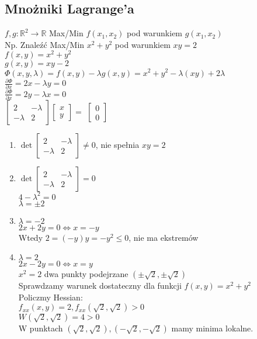 \documentclass{article}
\theoremstyle{definition}
\theoremstyle{definition}
\theoremstyle{definition}
\theoremstyle{definition}
\theoremstyle{definition}
\theoremstyle{definition}
\theoremstyle{definition}
\begin{document}
\subsection{Mnożniki Lagrange'a}

$f, g : \mathbb{R}^2 \rightarrow \mathbb{R}$
Max/Min $f(x_1,x_2)$ pod warunkiem $g(x_1,x_2)$\\
Np. Znaleźć Max/Min $x^2+y^2$ pod warunkiem $xy=2$\\
$f(x,y)=x^2+y^2$\\
$g(x,y)=xy-2$\\
$\Phi(x,y,\lambda)=f(x,y)-\lambda g(x,y) = x^2+y^2 - \lambda(xy) + 2\lambda$\\
$\frac{\partial \Phi}{\partial x} = 2x - \lambda y = 0$\\
$\frac{\partial \Phi}{\partial x} = 2y - \lambda x = 0$\\
$ \begin{bmatrix}
    2 & -\lambda \\
    -\lambda & 2 
    \end{bmatrix}
\begin{bmatrix}
    x\\
    y
\end{bmatrix}
=
$
$
\begin{bmatrix}
0\\
0
\end{bmatrix}
$
\begin{enumerate}
    \item $\det \begin{bmatrix}
        2 & -\lambda \\
        -\lambda & 2 
        \end{bmatrix} \neq 0$, nie spełnia $xy=2$
    \item $\det \begin{bmatrix}
        2 & -\lambda \\
        -\lambda & 2 
        \end{bmatrix} = 0$\\
        $4-\lambda^2 =0$\\
        $\lambda = \pm 2$
    \item $\lambda = -2$\\
    $2x+2y=0\iff x=-y$\\
    Wtedy $2=(-y)y = -y^2\leq 0$, nie ma ekstremów
    \item $\lambda = 2$\\
    $2x-2y = 0 \iff x=y$\\
    $x^2=2$ dwa punkty podejrzane $(\pm\sqrt{2},\pm\sqrt{2})$\\
    Sprawdzamy warunek dostateczny dla funkcji $f(x,y)=x^2+y^2$\\
    Policzmy Hessian:\\
    $f_{xx}(x,y)=2, f_{xx} (\sqrt{2},\sqrt{2}) > 0$\\
    $W(\sqrt{2},\sqrt{2})=4>0$\\
    W punktach $(\sqrt{2},\sqrt{2}), (-\sqrt{2},-\sqrt{2})$ mamy minima lokalne.
\end{enumerate}
\end{document}
